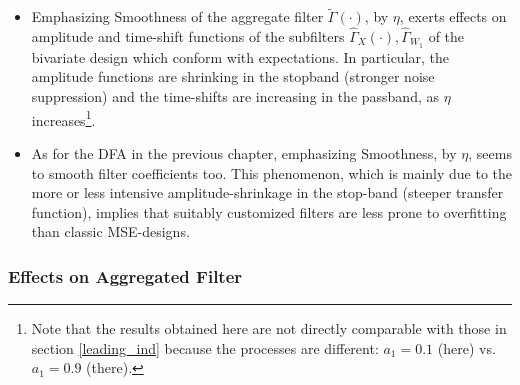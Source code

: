 \documentclass[a4paper]{book}
\begin{document}
\begin{itemize}
\item Emphasizing Smoothness of the aggregate filter $\tilde{\Gamma}(\cdot)$, by $\eta$,  exerts effects on amplitude and time-shift functions of the subfilters $\hat{\Gamma}_X(\cdot), \hat{\Gamma}_{W_1}$ of the bivariate design which conform with expectations. In particular, the amplitude functions are shrinking in the stopband (stronger noise suppression) and the time-shifts are increasing in the passband, as $\eta$ increases\footnote{Note that the results obtained here are not directly comparable with those in section \ref{leading_ind} because the processes are different: $a_1=0.1$ (here) vs. $a_1=0.9$ (there).}.
\item As for the DFA in the previous chapter, emphasizing Smoothness, by $\eta$, seems to smooth filter coefficients too. This phenomenon, which is mainly due to the more or less intensive amplitude-shrinkage in the stop-band (steeper transfer function), implies that suitably customized filters are less prone to overfitting than classic MSE-designs. 
\end{itemize}



\subsubsection{Effects on Aggregated Filter}
\end{document}
